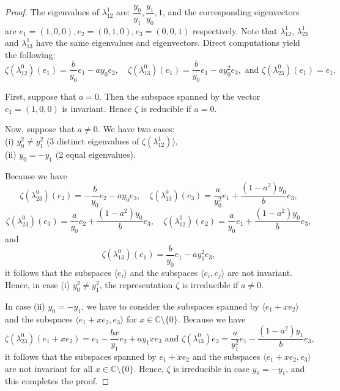 \documentclass[preprint]{elsarticle}
\begin{document}
\begin{proof}
The eigenvalues of $\lambda^1_{12}$ are: $\dfrac{y_0}{y_1}, \dfrac{y_1}{y_0}, 1$, and the corresponding eigenvectors are $e_1=(1,0,0),  e_2=(0,1,0),  e_3=(0,0,1)$ respectively.
Note that $\lambda^1_{12}$, $\lambda^1_{23}$ and $\lambda^1_{13}$ have the same eigenvalues and eigenvectors.
Direct computations yield the following:
$$\zeta(\lambda^0_{12})(e_1)=\dfrac{b}{y_0}e_1-ay_0e_2,\quad \zeta(\lambda^0_{13})(e_1)=\dfrac{b}{y_0}e_1-ay_0^2e_3, \text{ and } \zeta(\lambda^0_{23})(e_1)=e_1.$$

First, suppose that $a=0$. Then the subspace spanned by the vector $e_1=(1,0,0)$ is invariant. Hence $\zeta$ is reducible if $a=0$.

Now, suppose that $a\neq 0$. We have two cases: \\
(i) $y_0^2\neq y_1^2$ (3 distinct eigenvalues of $\zeta(\lambda_{12}^1)$),\\
(ii) $y_0=-y_1$ (2 equal eigenvalues).

Because we have
$$\zeta(\lambda^0_{23})(e_2)=-\dfrac{b}{y_0}e_2-ay_0e_3, \quad \zeta(\lambda^0_{13})(e_3)=\dfrac{a}{y_0^2}e_1+\dfrac{(1-a^2)y_0}{b}e_3,$$
$$\zeta(\lambda^0_{23})(e_3)=\dfrac{a}{y_0}e_2+\dfrac{(1-a^2)y_0}{b}e_3, \quad \zeta(\lambda^0_{12})(e_2)=\dfrac{a}{y_0}e_1+\dfrac{(1-a^2)y_0}{b}e_3,$$ and
$$\zeta(\lambda^0_{13})(e_1)=\dfrac{b}{y_0}e_1-ay_0^2e_3,$$
it follows that the subspaces  $\langle e_i\rangle$ and the subspaces $\langle e_i,e_j\rangle$ are not invariant.
Hence, in case (i) $y_0^2\neq y_1^2$, the representation $\zeta$ is irreducible if $a\neq 0$.

In case (ii) $y_0=-y_1$, we have to consider the subspaces 
spanned by 
$\langle e_1+xe_2 \rangle $ and the subspaces $\langle e_1+xe_2,e_3\rangle $ for $x\in\mathbb{C}\setminus\{0\}$. Because we have 
$$ \zeta(\lambda_{23}^0)(e_1+xe_2)=e_1-\dfrac{bx}{y_1}e_2+ay_1xe_3 \text{ and } \zeta(\lambda_{13}^0)e_3=\dfrac{a}{y_1^2}e_1-\dfrac{\left(1-a^2\right)y_1}{b}e_3,$$
it follows that the subspaces spanned by $e_1+xe_2$ and the subspaces $\langle e_1+xe_2,e_3\rangle$ are not invariant for all $x\in\mathbb{C}\setminus\{0\}$. Hence, $\zeta$ is irreducible in case $y_0=-y_1$, and this completes the proof.
\end{proof}
\end{document}
